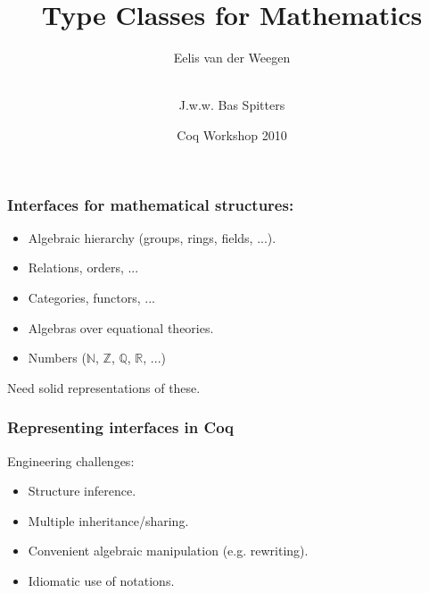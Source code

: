 \documentclass{beamer}
\title{Type Classes for Mathematics}
\author[Eelis van der Weegen et al.]{
Eelis van der Weegen \and \\
{\small J.w.w. Bas Spitters}}
\institute{Radboud University Nijmegen}
\date{Coq Workshop 2010}
\begin{document}
\begin{frame}\titlepage\end{frame}

\begin{frame}
\frametitle{Interfaces for mathematical structures:}


\begin{itemize}
\item Algebraic hierarchy (groups, rings, fields, ...).
\item Relations, orders, ...
\item Categories, functors, ...
\item Algebras over equational theories.
\item Numbers ($\mathbb{N}$, $\mathbb{Z}$, $\mathbb{Q}$, $\mathbb{R}$, ...)
\end{itemize}
Need solid representations of these.
\end{frame}

\begin{frame}
\frametitle{Representing interfaces in Coq}

Engineering challenges:
\begin{itemize}
\item Structure inference.
\item Multiple inheritance/sharing.
\item Convenient algebraic manipulation (e.g. rewriting).
\item Idiomatic use of notations.
\end{itemize}
\end{frame}
\end{document}
